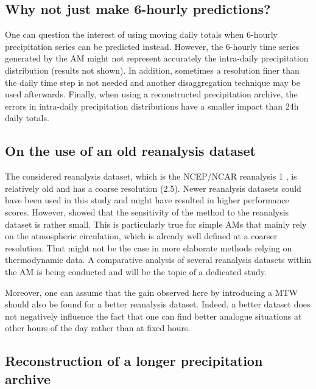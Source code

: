 \documentclass[hess, manuscript]{copernicus}
\begin{document}
	
	\subsection{Why not just make 6-hourly predictions?}
	
	One can question the interest of using moving daily totals when 6-hourly precipitation series can be predicted instead. However, the 6-hourly time series generated by the AM might not represent accurately the intra-daily precipitation distribution (results not shown). In addition, sometimes a resolution finer than the daily time step is not needed and another disaggregation technique may be used afterwards. Finally, when using a reconstructed precipitation archive, the errors in intra-daily precipitation distributions have a smaller impact than 24h daily totals.
	
	
	\subsection{On the use of an old reanalysis dataset}
	\label{sec:old_reanalysis}
	
	The considered reanalysis dataset, which is the NCEP/NCAR reanalysis 1 \citep{Kalnay1996}, is relatively old and has a coarse resolution (2.5\textdegree). Newer reanalysis datasets could have been used in this study and might have resulted in higher performance scores. However, \cite{BenDaoud2009} showed that the sensitivity of the method to the reanalysis dataset is rather small. This is particularly true for simple AMs that mainly rely on the atmospheric circulation, which is already well defined at a coarser resolution. That might not be the case in more elaborate methods relying on thermodynamic data. A comparative analysis of several reanalysis datasets within the AM is being conducted and will be the topic of a dedicated study.
	
	Moreover, one can assume that the gain observed here by introducing a MTW should also be found for a better reanalysis dataset. Indeed, a better dataset does not negatively influence the fact that one can find better analogue situations at other hours of the day rather than at fixed hours.
	
	
	

	\subsection{Reconstruction of a longer precipitation archive}
	\label{sec:reconstruction}
	
\end{document}
